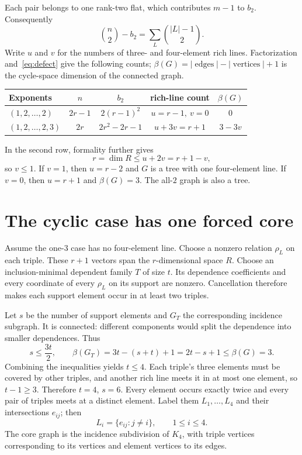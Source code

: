 \documentclass[11pt]{article}
\begin{document}
Each pair belongs to one rank-two flat, which contributes $m-1$ to $b_2$. Consequently
\begin{equation}\label{eq:defect}
\binom n2-b_2=\sum_L\binom{|L|-1}{2}.
\end{equation}
Write $u$ and $v$ for the numbers of three- and four-element rich lines. Factorization and~\eqref{eq:defect} give the following counts; $\beta(G)=|\operatorname{edges}|-|\operatorname{vertices}|+1$ is the cycle-space dimension of the connected graph.
\begin{center}
\begin{tabular}{lcccc}
\toprule
Exponents & $n$ & $b_2$ & rich-line count & $\beta(G)$\\
\midrule
$(1,2,\ldots,2)$ & $2r-1$ & $2(r-1)^2$ & $u=r-1,\ v=0$ & $0$\\
$(1,2,\ldots,2,3)$ & $2r$ & $2r^2-2r-1$ & $u+3v=r+1$ & $3-3v$\\
\bottomrule
\end{tabular}
\end{center}
In the second row, formality further gives
\[
r=\dim R\leq u+2v=r+1-v,
\]
so $v\leq1$. If $v=1$, then $u=r-2$ and $G$ is a tree with one four-element line. If $v=0$, then $u=r+1$ and $\beta(G)=3$. The all-$2$ graph is also a tree.

\section{The cyclic case has one forced core}
Assume the one-$3$ case has no four-element line. Choose a nonzero relation $\rho_L$ on each triple. These $r+1$ vectors span the $r$-dimensional space $R$. Choose an inclusion-minimal dependent family $T$ of size $t$. Its dependence coefficients and every coordinate of every $\rho_L$ on its support are nonzero. Cancellation therefore makes each support element occur in at least two triples.

Let $s$ be the number of support elements and $G_T$ the corresponding incidence subgraph. It is connected: different components would split the dependence into smaller dependences. Thus
\[
s\leq\frac{3t}{2},\qquad
\beta(G_T)=3t-(s+t)+1=2t-s+1\leq\beta(G)=3.
\]
Combining the inequalities yields $t\leq4$. Each triple's three elements must be covered by other triples, and another rich line meets it in at most one element, so $t-1\geq3$. Therefore $t=4$, $s=6$. Every element occurs exactly twice and every pair of triples meets at a distinct element. Label them $L_1,\ldots,L_4$ and their intersections $e_{ij}$; then
\[
L_i=\{e_{ij}:j\ne i\},\qquad 1\leq i\leq4.
\]
The core graph is the incidence subdivision of $K_4$, with triple vertices corresponding to its vertices and element vertices to its edges.
\end{document}
